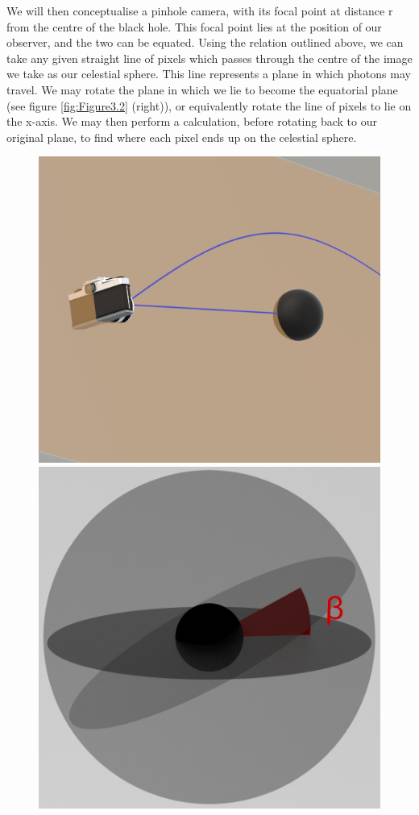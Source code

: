 \documentclass[oneside,openright,frontopenright, singlespacing]{dmathesis}
\begin{document}
\vspace{1em}
	We will then conceptualise a pinhole camera, with its focal point at distance r from the centre of the black hole. This focal point lies at the position of our observer, and the two can be equated. Using the relation outlined above, we can take any given straight line of pixels which passes through the centre of the image we take as our celestial sphere. This line represents a plane in which photons may travel. We may rotate the plane in which we lie to become the equatorial plane (see figure \ref{fig:Figure3.2} (right)), or equivalently rotate the line of pixels to lie on the x-axis. We may then perform a calculation, before rotating back to our original plane, to find where each pixel ends up on the celestial sphere.

\begin{figure}[!ht]
	\centering
	\begin{minipage}{0.5\textwidth}
		\centering
		\includegraphics[width=0.8\linewidth]{img/plane}
	\end{minipage}%
	\hfill
	\begin{minipage}{0.5\textwidth}
		\centering
		\includegraphics[width=0.72\linewidth]{img/inclinationfigure}

\end{minipage}
\end{figure}
\end{document}
